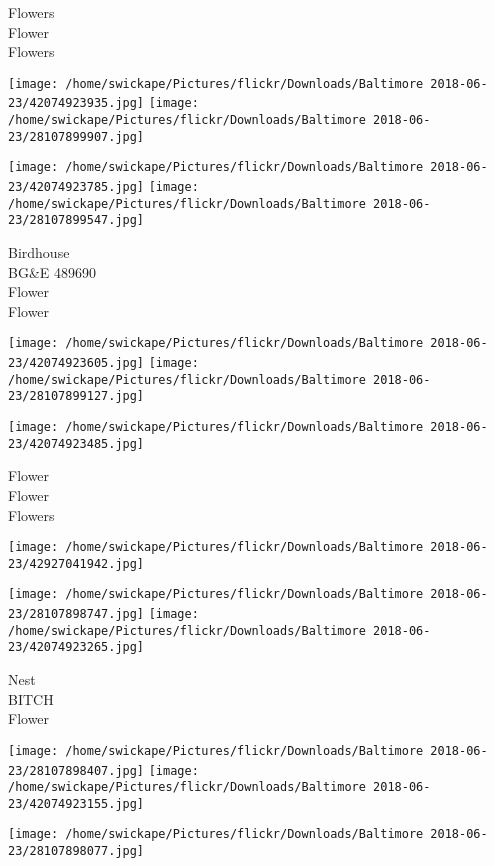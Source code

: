\documentclass[10pt,letterpaper]{article}
\begin{document}
Flowers\\
Flower\\
Flowers\\
\pagebreak

\texttt{[image: /home/swickape/Pictures/flickr/Downloads/Baltimore 2018-06-23/42074923935.jpg]}
\texttt{[image: /home/swickape/Pictures/flickr/Downloads/Baltimore 2018-06-23/28107899907.jpg]}

\texttt{[image: /home/swickape/Pictures/flickr/Downloads/Baltimore 2018-06-23/42074923785.jpg]}
\texttt{[image: /home/swickape/Pictures/flickr/Downloads/Baltimore 2018-06-23/28107899547.jpg]}

Birdhouse\\
BG\&E 489690\\
Flower\\
Flower\\
\pagebreak

\texttt{[image: /home/swickape/Pictures/flickr/Downloads/Baltimore 2018-06-23/42074923605.jpg]}
\texttt{[image: /home/swickape/Pictures/flickr/Downloads/Baltimore 2018-06-23/28107899127.jpg]}

\texttt{[image: /home/swickape/Pictures/flickr/Downloads/Baltimore 2018-06-23/42074923485.jpg]}

Flower\\
Flower\\
Flowers\\
\pagebreak

\texttt{[image: /home/swickape/Pictures/flickr/Downloads/Baltimore 2018-06-23/42927041942.jpg]}

\vspace{0.25in}
\texttt{[image: /home/swickape/Pictures/flickr/Downloads/Baltimore 2018-06-23/28107898747.jpg]}
\texttt{[image: /home/swickape/Pictures/flickr/Downloads/Baltimore 2018-06-23/42074923265.jpg]}

Nest\\
BITCH\\
Flower\\
\pagebreak

\texttt{[image: /home/swickape/Pictures/flickr/Downloads/Baltimore 2018-06-23/28107898407.jpg]}
\texttt{[image: /home/swickape/Pictures/flickr/Downloads/Baltimore 2018-06-23/42074923155.jpg]}

\texttt{[image: /home/swickape/Pictures/flickr/Downloads/Baltimore 2018-06-23/28107898077.jpg]}
\end{document}
